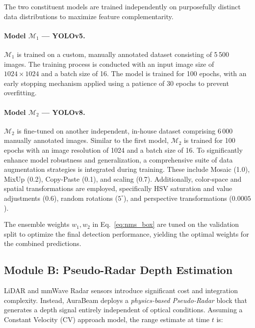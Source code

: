 \documentclass{jstarticle}
\theoremstyle{remark}
\begin{document}
The two constituent models are trained independently on purposefully
distinct data distributions to maximize feature complementarity.

\paragraph{Model $\mathcal{M}_1$ --- YOLOv5.}
$\mathcal{M}_1$ is trained on a custom, manually annotated dataset consisting of 5\,500 images. The training process is conducted with an input image size of $1024 \times 1024$ and a batch size of 16. The model is trained for 100 epochs, with an early stopping mechanism applied using a patience of 30 epochs to prevent overfitting. 

\paragraph{Model $\mathcal{M}_2$ --- YOLOv8.}
$\mathcal{M}_2$ is fine-tuned on another independent, in-house dataset comprising 6\,000 manually annotated images. Similar to the first model, $\mathcal{M}_2$ is trained for 100 epochs with an image resolution of 1024 and a batch size of 16. To significantly enhance model robustness and generalization, a comprehensive suite of data augmentation strategies is integrated during training. These include Mosaic (1.0), MixUp (0.2), Copy-Paste (0.1), and scaling (0.7). Additionally, color-space and spatial transformations are employed, specifically HSV saturation and value adjustments ($0.6$), random rotations ($5^{\circ}$), and perspective transformations ($0.0005$).

The ensemble weights $w_1, w_2$ in Eq.~\eqref{eq:nms_box} are tuned on the validation split to optimize the final detection performance, yielding the optimal weights for the combined predictions.
\subsection{Module B: Pseudo-Radar Depth Estimation}
\label{subsec:radar}

LiDAR and mmWave Radar sensors introduce significant cost and
integration complexity. Instead, AuraBeam deploys a
\emph{physics-based Pseudo-Radar} block that generates a depth signal
entirely independent of optical conditions. Assuming a Constant
Velocity (CV) approach model, the range estimate at time $t$ is:
\end{document}

